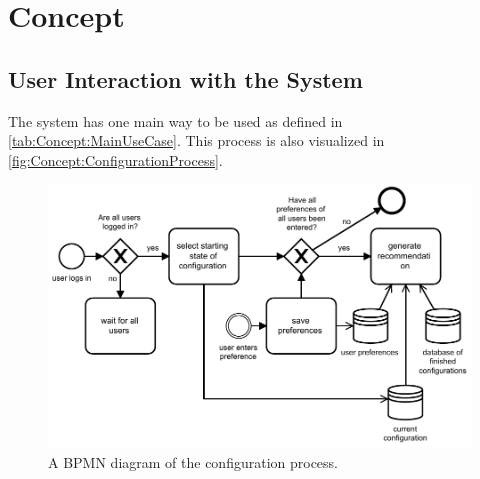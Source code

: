 \chapter{Concept}
\label{ch:Concept}

\section{User Interaction with the System}
\label{sec:Concept:UserSystemInteraction}

The system has one main way to be used as defined in \autoref{tab:Concept:MainUseCase}. This process is also visualized in \autoref{fig:Concept:ConfigurationProcess}.

\begin{figure}
    \centering
    \includegraphics[width=1\textwidth]{./figures/40_concept/bpmn_configuration_process_with_continious_recommendation.pdf}
    \caption{A BPMN diagram of the configuration process.}
    \label{fig:Concept:ConfigurationProcess}
\end{figure}

